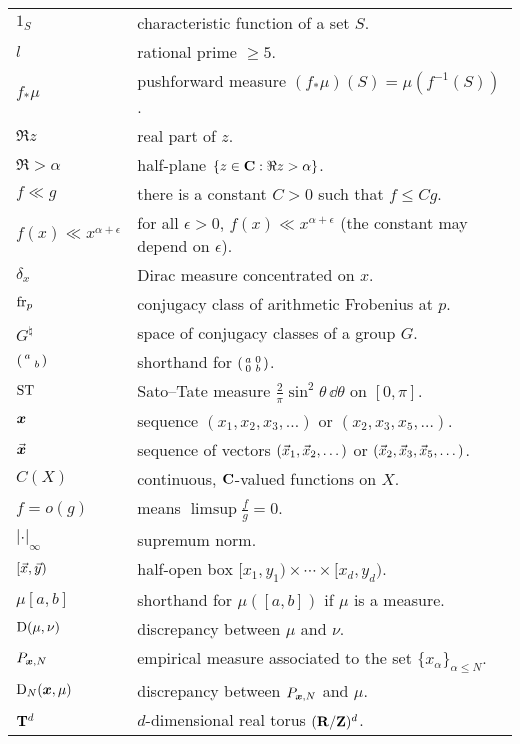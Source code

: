 \documentclass[phd,tocprelim]{cornell}
\begin{document}
\contentspage





\symlist

\begin{tabular}{ll}
$1_S$     
	& characteristic function of a set $S$. \\
$l$       
	& rational prime $\geqslant 5$. \\
$f_\ast\mu$
	& pushforward measure $(f_\ast\mu)(S) = \mu(f^{-1}(S))$. \\
$\Re z$
	& real part of $z$. \\
$\Re > \alpha$
	& half-plane $\{z\in \mathbf{C} : \Re z > \alpha\}$. \\
$f \ll g$ 
	& there is a constant $C>0$ such that $f \leqslant C g$. \\
$f(x) \ll x^{\alpha+\epsilon}$ 
	& for all $\epsilon>0$, $f(x) \ll x^{\alpha+\epsilon}$ (the constant may depend on $\epsilon$). \\
$\delta_x$
	& Dirac measure concentrated on $x$. \\
$\mathrm{fr}_p$
	& conjugacy class of arithmetic Frobenius at $p$. \\
$G^\natural$
	& space of conjugacy classes of a group $G$. \\
$\left(\begin{smallmatrix} a &  \\  & b \end{smallmatrix}\right)$
	& shorthand for $\left(\begin{smallmatrix} a & 0 \\ 0 & b \end{smallmatrix}\right)$. \\
$\mathrm{ST}$
	& Sato--Tate measure $\frac{2}{\pi} \sin^2\theta\, \dd\theta$ on $[0,\pi]$. \\
${\boldsymbol x}$
	& sequence $(x_1,x_2,x_3,\dots)$ or $(x_2,x_3,x_5,\dots)$. \\
$\vec{\boldsymbol x}$
	& sequence of vectors $(\vec{x}_1,\vec{x}_2,\dots)$ or $(\vec{x}_2,\vec{x}_3,\vec{x}_5,\dots)$. \\
$C(X)$
	& continuous, $\mathbf{C}$-valued functions on $X$. \\
$f = o(g)$
	& means $\limsup \frac f g = 0$. \\
$|\cdot|_\infty$
	& supremum norm. \\
$[\vec{x},\vec{y})$
	& half-open box $[x_1,y_1) \times \cdots \times [x_d,y_d)$. \\
$\mu[a,b]$
	& shorthand for $\mu([a,b])$ if $\mu$ is a measure. \\
$\operatorname{D}(\mu,\nu)$
	& discrepancy between $\mu$ and $\nu$. \\
$P_{{\boldsymbol x},N}$
	& empirical measure associated to the set $\{x_\alpha\}_{\alpha\leqslant N}$. \\
$\operatorname{D}_N({\boldsymbol x},\mu)$
	& discrepancy between $P_{{\boldsymbol x},N}$ and $\mu$. \\
$\mathbf{T}^d$
	& $d$-dimensional real torus $(\mathbf{R}/\mathbf{Z})^d$. \\

\end{tabular}
\end{document}
